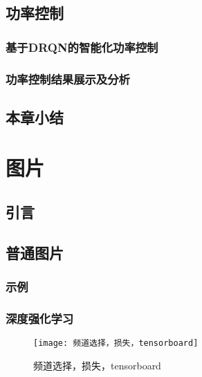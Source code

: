 \section{功率控制}
\subsection{基于DRQN的智能化功率控制}

\subsection{功率控制结果展示及分析}



\section{本章小结}






















\chapter{图片}


\section{引言}

\section{普通图片}

\subsection{示例}

\subsection{深度强化学习}
\begin{figure}[h]
	\centering
	\texttt{[image: 频道选择，损失，tensorboard]}
	\caption{频道选择，损失，tensorboard}
	\label{fig:channel choose loss tensorboard}
\end{figure}

